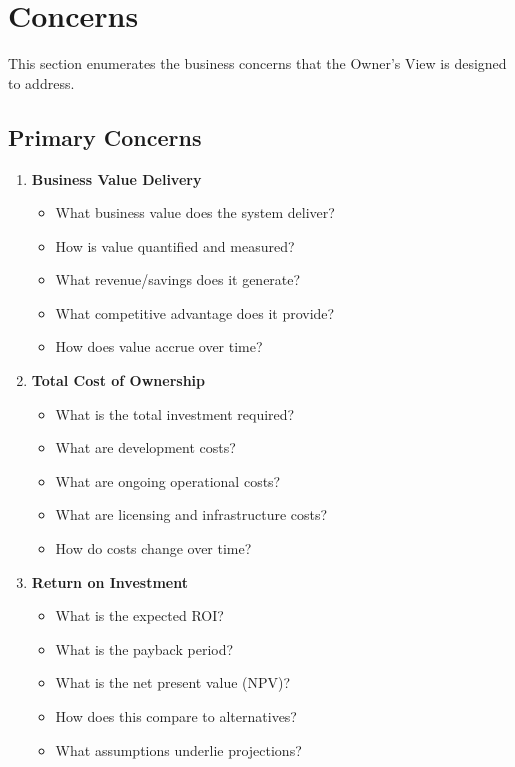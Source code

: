 \documentclass[11pt,letterpaper]{article}
\begin{document}
\section{Concerns}

This section enumerates the business concerns that the Owner's View is designed to address.

\subsection{Primary Concerns}

\begin{enumerate}[label=\textbf{C\arabic*:}, leftmargin=2.5em]
    \item \textbf{Business Value Delivery}
    \begin{itemize}[nosep]
        \item What business value does the system deliver?
        \item How is value quantified and measured?
        \item What revenue/savings does it generate?
        \item What competitive advantage does it provide?
        \item How does value accrue over time?
    \end{itemize}
    
    \item \textbf{Total Cost of Ownership}
    \begin{itemize}[nosep]
        \item What is the total investment required?
        \item What are development costs?
        \item What are ongoing operational costs?
        \item What are licensing and infrastructure costs?
        \item How do costs change over time?
    \end{itemize}
    
    \item \textbf{Return on Investment}
    \begin{itemize}[nosep]
        \item What is the expected ROI?
        \item What is the payback period?
        \item What is the net present value (NPV)?
        \item How does this compare to alternatives?
        \item What assumptions underlie projections?
    \end{itemize}
    

\end{enumerate}
\end{document}
